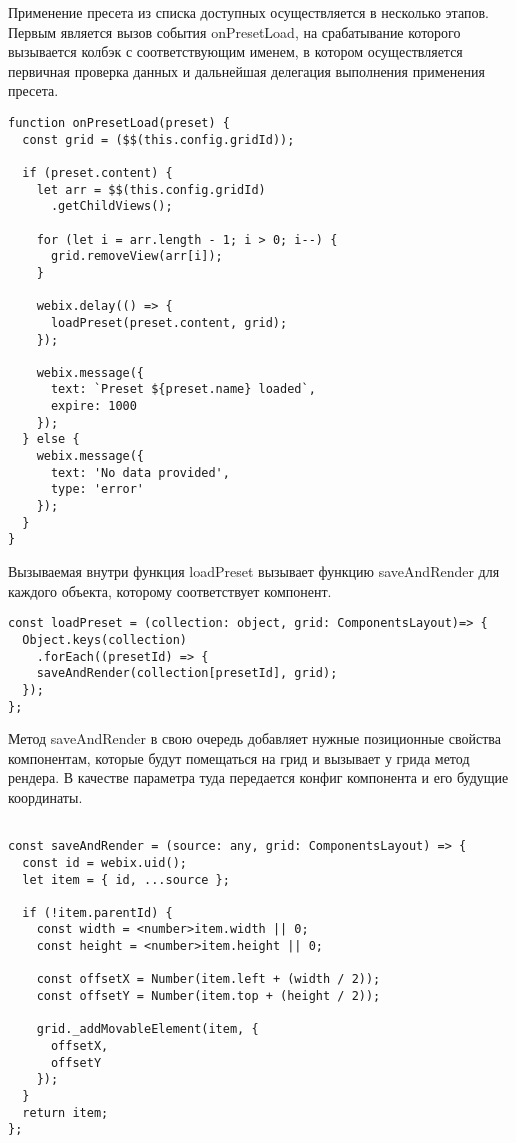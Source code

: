 Применение пресета из списка доступных осуществляется в несколько этапов. 
Первым является вызов события onPresetLoad, на срабатывание которого вызывается колбэк с соответствующим именем, в котором осуществляется первичная проверка данных и дальнейшая делегация выполнения применения пресета.

\begin{lstlisting}
function onPresetLoad(preset) {
  const grid = ($$(this.config.gridId));

  if (preset.content) {
    let arr = $$(this.config.gridId)
      .getChildViews();

    for (let i = arr.length - 1; i > 0; i--) {
      grid.removeView(arr[i]);
    }

    webix.delay(() => {
      loadPreset(preset.content, grid);
    });

    webix.message({
      text: `Preset ${preset.name} loaded`,
      expire: 1000
    });
  } else {
    webix.message({
      text: 'No data provided',
      type: 'error'
    });
  }
}
\end{lstlisting}

Вызываемая внутри функция loadPreset вызывает функцию saveAndRender для каждого объекта, которому соответствует компонент.

\begin{lstlisting}  
const loadPreset = (collection: object, grid: ComponentsLayout)=> {
  Object.keys(collection)
    .forEach((presetId) => {
    saveAndRender(collection[presetId], grid);
  });
};    
\end{lstlisting}

Метод saveAndRender в свою очередь добавляет нужные позиционные свойства компонентам, которые будут помещаться на грид и вызывает у грида метод рендера. В качестве параметра туда передается конфиг компонента и его будущие координаты.

\begin{lstlisting}
    
const saveAndRender = (source: any, grid: ComponentsLayout) => {
  const id = webix.uid();
  let item = { id, ...source };
  
  if (!item.parentId) {
    const width = <number>item.width || 0;
    const height = <number>item.height || 0;
  
    const offsetX = Number(item.left + (width / 2));
    const offsetY = Number(item.top + (height / 2));
  
    grid._addMovableElement(item, {
      offsetX,
      offsetY
    });
  }
  return item;
};
\end{lstlisting}

